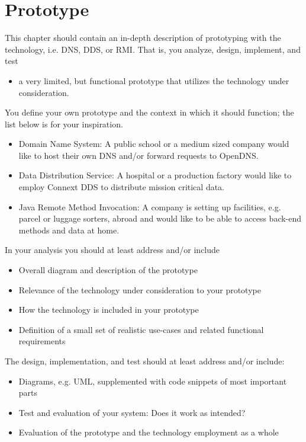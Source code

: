 \chapter{Prototype}
This chapter should contain an in-depth description of prototyping
with the technology, i.e. DNS, DDS, or RMI. That is, you analyze,
design, implement, and test
\begin{itemize}
\item a very limited, but functional prototype that utilizes the
  technology under consideration.
\end{itemize}

You define your own prototype and the context in which it should
function; the list below is for your inspiration.

\begin{itemize}
\item Domain Name System: A public school or a medium sized company
  would like to host their own DNS and/or forward requests to OpenDNS.
\item Data Distribution Service: A hospital or a production factory
  would like to employ Connext DDS to distribute mission critical
  data.
\item Java Remote Method Invocation: A company is setting up
  facilities, e.g. parcel or luggage sorters, abroad and would like to
  be able to access back-end methods and data at home.
\end{itemize}

In your analysis you should at least address and/or include

\begin{itemize}
\item Overall diagram and description of the prototype
\item Relevance of the technology under consideration to your prototype
\item How the technology is included in your prototype
\item Definition of a small set of realistic use-cases and related
  functional requirements
\end{itemize}

The design, implementation, and test should at least address and/or include:

\begin{itemize}
\item Diagrams, e.g. UML, supplemented with code snippets of most important parts
\item Test and evaluation of your system: Does it work as intended?
\item Evaluation of the prototype and the technology employment as a
  whole
\end{itemize}
